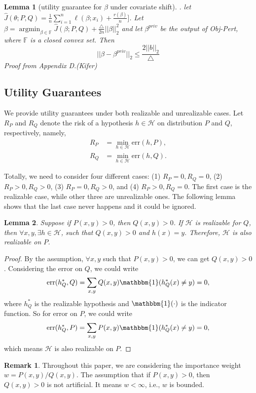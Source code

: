 \documentclass{article}
\newcommand{\argmin}{\mathop{\mathrm{argmin}}}
\def\cH{\mathcal{H}}
\newtheorem{lemma}{Lemma}
\theoremstyle{definition}
\newtheorem*{remark}{Remark}
\begin{document}
\begin{lemma}[utility guarantee for $\beta$ under covariate shift]. let $\hat J(\theta; P,Q) = \frac{1}{n}\sum_{i=1}^n \ell(\beta ; x_i) + \frac{r(\beta)}{n}]$. Let $\beta = \argmin_{\beta \in \mathbb{F}} \hat J(\beta;P,Q) + \frac{\triangle}{2n}||\beta||_2^2$ and let $\beta^{priv}$ be the output of Obj-Pert, where $\mathbb{F}$ is a closed convex set. Then
	$$
	||\beta - \beta^{priv}||_2 \leq \frac{2||b||_2}{\triangle}
	$$
	Proof from Appendix D.(Kifer)
\end{lemma}
	\subsection{Utility Guarantees}
We provide utility guarantees under both realizable and unrealizable cases. Let $R_P$ and $R_Q$ denote the risk of a hypothesis $h\in \cH$ on distribution $P$ and $Q$, respectively, namely,
\begin{align*}
R_P &= \min_{h\in \cH} \text{err}(h,P),\\
R_Q &= \min_{h\in \cH} \text{err}(h,Q).
\end{align*}

Totally, we need to consider four different cases: (1) $R_P=0, R_Q=0$, (2) $R_P>0, R_Q>0$, (3) $R_P=0, R_Q>0$, and (4) $R_P>0, R_Q=0$. The first case is the realizable case, while other three are unrealizable ones. The following lemma shows that the last case never happens and it could be ignored.
\begin{lemma}
	Suppose if $P(x,y) > 0$, then $Q(x,y)>0$. If $\cH$ is realizable for $Q$, then $\forall x,y, \exists h\in \cH$, such that $Q(x,y)>0$ and $h(x)=y$. Therefore, $\cH$ is also realizable on $P$.
\end{lemma}
\begin{proof}
	By the assumption, $\forall x,y$ such that $P(x,y)>0$, we can get $Q(x,y)>0$. Considering the error on $Q$, we could write
	\begin{align*}
	\text{err}(h^*_Q,Q)=\sum_{x,y} Q(x,y)\mathbbm{1}(h^*_Q(x)\neq y)=0,
	\end{align*}
	where $h^*_Q$ is the realizable hypothesis and $\mathbbm{1}(\cdot)$ is the indicator function. So for error on $P$, we could write
	\begin{align*}
	\text{err}(h^*_Q,P)=\sum_{x,y} P(x,y)\mathbbm{1}(h^*_Q(x)\neq y)=0,
	\end{align*}
	which means $\cH$ is also realizable on $P$.
\end{proof}
\begin{remark}
	Throughout this paper, we are considering the importance weight $w=P(x,y)/Q(x,y)$. The assumption that if $P(x,y) > 0$, then $Q(x,y)>0$ is not artificial. It means $w<\infty$, i.e., $w$ is bounded.
\end{remark}
\end{document}
